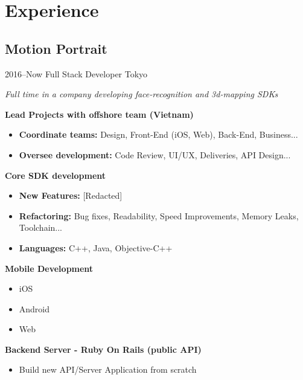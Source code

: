 \documentclass[]{template/friggeri-cv} %
\begin{document}

\section{Experience}


\subsection{Motion Portrait}
\begin{entrylist}


\entry
{2016--Now}
{Full Stack Developer}
{Tokyo}
{\emph{Full time in a company developing face-recognition and 3d-mapping SDKs}

\textbf{Lead Projects with offshore team (Vietnam)} 
\begin{itemize}
\item \textbf{Coordinate teams:} Design, Front-End (iOS, Web), Back-End, Business...
\item \textbf{Oversee development:} Code Review, UI/UX, Deliveries, API Design...
\end{itemize}
\textbf{Core SDK development} 
\begin{itemize}
\item \textbf{New Features:} [Redacted]
\item \textbf{Refactoring:} Bug fixes, Readability, Speed Improvements, Memory Leaks, Toolchain...
\item \textbf{Languages:} C++, Java, Objective-C++

\end{itemize}
\textbf{Mobile Development} 
\begin{itemize}
\item iOS
\item Android
\item Web
\end{itemize}

\textbf{Backend Server - Ruby On Rails (public API)} 
\begin{itemize}
\item Build new API/Server Application from scratch
\end{itemize}
}
\end{entrylist}
\end{document}
